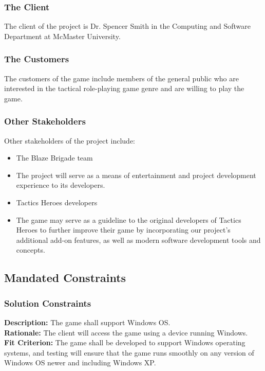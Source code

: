 \documentclass{article}
\begin{document}
\subsubsection{The Client}
The client of the project is Dr. Spencer Smith in the Computing and Software Department at McMaster University.

\subsubsection{The Customers}
The customers of the game include members of the general public who are interested in the tactical role-playing game genre and are willing to play the game.

\subsubsection{Other Stakeholders}
Other stakeholders of the project include:
\begin{itemize}
    \item The Blaze Brigade team
    \item[] The project will serve as a means of entertainment and project development experience to its developers.
    \item Tactics Heroes developers
    \item[] The game may serve as a guideline to the original developers of Tactics Heroes to further improve their game by incorporating our project’s additional add-on features, as well as modern software development tools and concepts.
\end{itemize}

\subsection{Mandated Constraints}

\subsubsection{Solution Constraints}
\textbf{Description:} The game shall support Windows OS. \\
\textbf{Rationale:} The client will access the game using a device running Windows. \\
\textbf{Fit Criterion:} The game shall be developed to support Windows operating systems, and testing will ensure that the game runs smoothly on any  version of Windows OS newer and including Windows XP.
\end{document}
